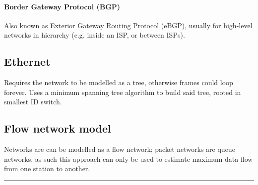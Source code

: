 \documentclass{form}
\begin{document}
\begin{multicols}{3}
    \paragraph{Border Gateway Protocol (BGP)}
    Also known as Exterior Gateway Routing Protocol (eBGP), usually for high-level networks in hierarchy (e.g. inside an ISP, or between ISPs).

    \subsection*{Ethernet}
    Requires the network to be modelled as a tree, otherwise frames could loop forever. Uses a minimum spanning tree algorithm to build said tree, rooted in smallest ID switch.

    \subsection*{Flow network model}
    Networks are can be modelled as a flow network; packet networks are queue networks, as such this approach can only be used to estimate maximum data flow from one station to another.

\end{multicols}

\vspace{-1.5em}\rule{\textwidth}{1.0pt}\vspace{-0.5em}
\end{document}
